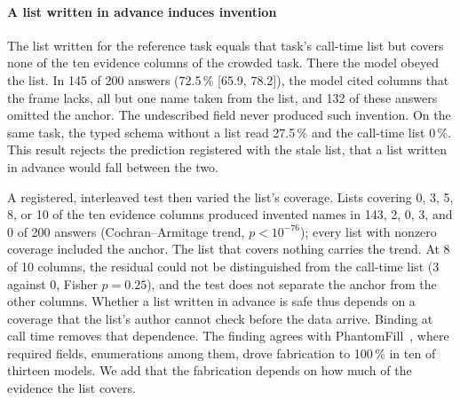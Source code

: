 \documentclass[journal]{IEEEtran}
\begin{document}
\paragraph{A list written in advance induces invention}
The list written for the reference task equals that task's call-time list but
covers none of the ten evidence columns of the crowded task. There the model
obeyed the list. In 145 of 200 answers (72.5\,\% [65.9, 78.2]), the model cited
columns that the frame lacks, all but one name taken from the list, and 132 of
these answers omitted the anchor. The undescribed field never produced such
invention. On the same task, the typed schema without a list read 27.5\,\% and
the call-time list 0\,\%. This result rejects the prediction registered with the
stale list, that a list written in advance would fall between the two.

A registered, interleaved test then varied the list's coverage. Lists covering 0,
3, 5, 8, or 10 of the ten evidence columns produced invented names in 143, 2, 0,
3, and 0 of 200 answers (Cochran--Armitage trend, $p<10^{-76}$); every list with
nonzero coverage included the anchor. The list that covers nothing carries the
trend. At 8 of 10 columns, the residual could not be distinguished from the
call-time list (3 against 0, Fisher $p=0.25$), and the test does not separate the
anchor from the other columns. Whether a list written in advance is safe thus
depends on a coverage that the list's author cannot check before the data arrive.
Binding at call time removes that dependence. The finding agrees with
PhantomFill~\cite{usman2026phantomfill}, where required fields, enumerations
among them, drove fabrication to 100\,\% in ten of thirteen models. We add that
the fabrication depends on how much of the evidence the list covers.
\end{document}
